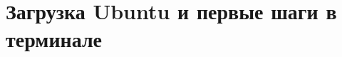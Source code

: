 \chapter{Загрузка Ubuntu и первые шаги в терминале}
\label{supplementary:ubuntu-terminal}
\begingroup
\setlength{\emergencystretch}{2em}
\providecommand{\tightlist}{\setlength{\itemsep}{0pt}\setlength{\parskip}{0pt}}

\endgroup

